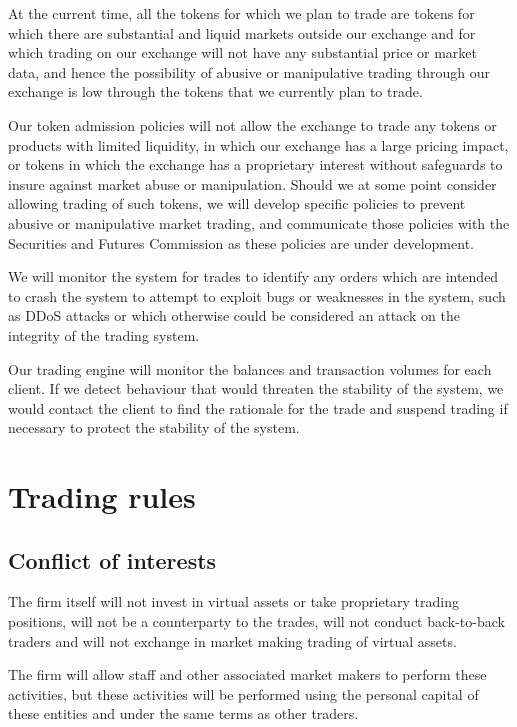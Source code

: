 At the current time, all the tokens for which we plan to trade are
tokens for which there are substantial and liquid markets outside
our exchange and for which trading on our exchange will not have any
substantial price or market data, and hence the possibility of abusive
or manipulative trading through our exchange is low through the tokens
that we currently plan to trade.

Our token admission policies will not allow the exchange to trade any
tokens or products with limited liquidity, in which our exchange has a
large pricing impact, or tokens in which the exchange has a
proprietary interest without safeguards to insure against market abuse
or manipulation.  Should we at some point consider allowing trading of
such tokens, we will develop specific policies to prevent abusive or
manipulative market trading, and communicate those policies with the
Securities and Futures Commission as these policies are under
development.

We will monitor the system for trades to identify any orders which are
intended to crash the system to attempt to exploit bugs or weaknesses
in the system, such as DDoS attacks or which otherwise could be considered an
attack on the integrity of the trading system.

Our trading engine will monitor the balances and transaction volumes
for each client.  If we detect behaviour that would
threaten the stability of the system, we would contact the client to
find the rationale for the trade and suspend trading if necessary to
protect the stability of the system.

\section{Trading rules}

\subsection{Conflict of interests}
The firm itself will not invest in virtual assets or take proprietary
trading positions, will not be a counterparty to the trades, will not
conduct back-to-back traders and will not exchange in market making
trading of virtual assets.

The firm will allow staff and other associated market makers to
perform these activities, but these activities will be performed using
the personal capital of these entities and under the same terms as
other traders.

